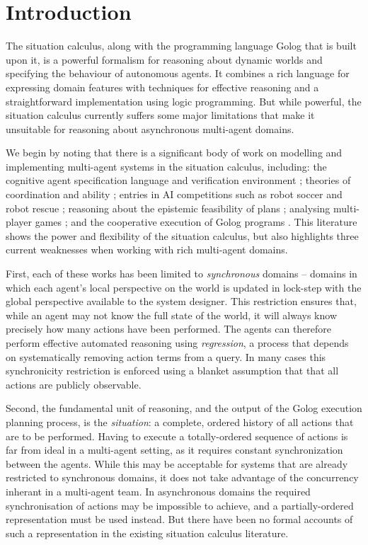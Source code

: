 

\chapter{Introduction}

\label{ch:intro}

The situation calculus, along with the programming language Golog
that is built upon it, is a powerful formalism for reasoning about
dynamic worlds and specifying the behaviour of autonomous agents.
It combines a rich language for expressing domain features with techniques
for effective reasoning and a straightforward implementation using
logic programming. But while powerful, the situation calculus currently
suffers some major limitations that make it unsuitable for reasoning
about asynchronous multi-agent domains.

We begin by noting that there is a significant body of work on modelling
and implementing multi-agent systems in the situation calculus, including:
the cognitive agent specification language and verification environment
\citep{shapiro02casl}; theories of coordination and ability \citep{ghaderi07sc_joint_ability};
entries in AI competitions such as robot soccer \citep{Ferrein2005readylog}
and robot rescue \citep{farinelli07team_golog}; reasoning about the
epistemic feasibility of plans \citep{Lesperance01epi_feas_casl};
analysing multi-player games \citep{delgrande01sitcalc_cleudo}; and
the cooperative execution of Golog programs \citep{Ferrein2005readylog,kelly06hlp_dps}.
This literature shows the power and flexibility of the situation calculus,
but also highlights three current weaknesses when working with rich
multi-agent domains.

First, each of these works has been limited to \emph{synchronous}
domains -- domains in which each agent's local perspective on the
world is updated in lock-step with the global perspective available
to the system designer. This restriction ensures that, while an agent
may not know the full state of the world, it will always know precisely
how many actions have been performed. The agents can therefore perform
effective automated reasoning using \emph{regression}, a process that
depends on systematically removing action terms from a query. In many
cases this synchronicity restriction is enforced using a blanket assumption
that that all actions are publicly observable.

Second, the fundamental unit of reasoning, and the output of the Golog
execution planning process, is the \emph{situation}: a complete, ordered
history of all actions that are to be performed. Having to execute
a totally-ordered sequence of actions is far from ideal in a multi-agent
setting, as it requires constant synchronization between the agents.
While this may be acceptable for systems that are already restricted
to synchronous domains, it does not take advantage of the concurrency
inherant in a multi-agent team. In asynchronous domains the required
synchronisation of actions may be impossible to achieve, and a partially-ordered
representation must be used instead. But there have been no formal
accounts of such a representation in the existing situation calculus
literature.

